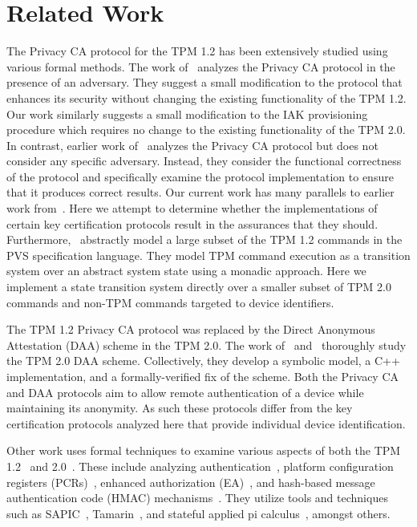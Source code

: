 \documentclass[runningheads]{llncs}
\begin{document}
\section{Related Work}
The Privacy CA protocol for the TPM 1.2 has been extensively studied
using various formal methods.  The work
of~\citet{PrivacyCAAnalysis-Chen} analyzes the Privacy CA protocol in
the presence of an adversary. They suggest a small modification to the
protocol that enhances its security without changing the existing
functionality of the TPM 1.2. Our work similarly suggests a small
modification to the IAK provisioning procedure which requires no
change to the existing functionality of the TPM 2.0.  In contrast,
earlier work of~\citet{PrivacyCAAnalysis-Hall,TPM12Model} analyzes the
Privacy CA protocol but does not consider any specific
adversary. Instead, they consider the functional correctness of the
protocol and specifically examine the protocol implementation to
ensure that it produces correct results.  Our current work has many
parallels to earlier work from~\citeauthor{PrivacyCAAnalysis-Hall}.
Here we attempt to determine whether the implementations of certain
key certification protocols result in the assurances that they should.
Furthermore,~\citeauthor{PrivacyCAAnalysis-Hall} abstractly model a
large subset of the TPM 1.2 commands in the PVS specification
language. They model TPM command execution as a transition system over
an abstract system state using a monadic approach. Here we implement a
state transition system directly over a smaller subset of TPM 2.0
commands and non-TPM commands targeted to device identifiers.

The TPM 1.2 Privacy CA protocol was replaced by the Direct Anonymous Attestation
(DAA) scheme in the TPM 2.0.  The work of~\citet{DAAAnalysis-Whit}
and~\citet{DAAAnalysis-Wes} thoroughly study the TPM 2.0 DAA scheme.
Collectively, they develop a symbolic model, a C++ implementation, and a
formally-verified fix of the scheme. Both the Privacy CA and DAA protocols aim
to allow remote authentication of a device while maintaining its anonymity. As
such these protocols differ from the key certification protocols analyzed here
that provide individual device identification.

Other work uses formal techniques to examine various aspects of both the TPM
1.2~\citep{AuthAnalysis,PCRAnalysis} and 2.0~\citep{EAAnalysis,HMACAnalysis}.
These include analyzing authentication~\citep{AuthAnalysis}, platform
configuration registers (PCRs)~\citep{PCRAnalysis}, enhanced
authorization (EA)~\citep{EAAnalysis}, and hash-based message authentication code
(HMAC) mechanisms~\citep{HMACAnalysis}. They utilize tools and techniques such
as SAPIC~\citep{kremer2016automated}, Tamarin~\citep{meier2013tamarin}, and
stateful applied pi calculus~\citep{Milner:99:Communicating-a}, amongst others.
%
%
%
\end{document}
